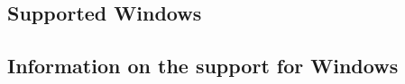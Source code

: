 

\subsection{Supported Windows \gdauts{}}


\subsection{Information on the support for Windows \gdauts{}}

